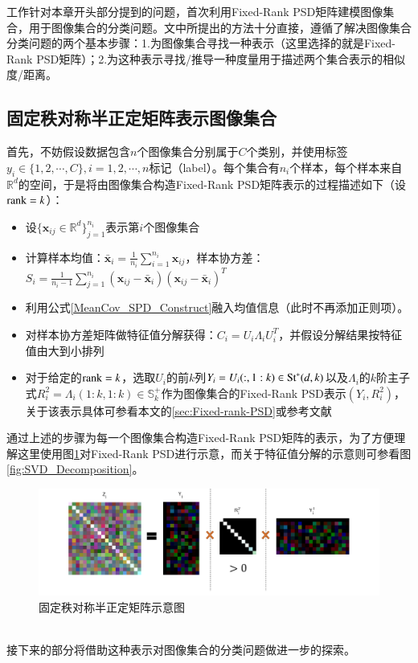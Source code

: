 工作\cite{PSD_WACV}针对本章开头部分提到的问题，首次利用Fixed-Rank PSD矩阵建模图像集合，用于图像集合的分类问题。文中所提出的方法十分直接，遵循了解决图像集合分类问题的两个基本步骤：1.为图像集合寻找一种表示（这里选择的就是Fixed-Rank PSD矩阵）；2.为这种表示寻找/推导一种度量用于描述两个集合表示的相似度/距离。
\subsection{固定秩对称半正定矩阵表示图像集合}
\label{sec:Fixed_Rank_PSD_repr_Imageset}
首先，不妨假设数据包含$n$个图像集合分别属于$C$个类别，并使用标签$y_{i}\in\{1,2,\cdots,C\},i=1,2,\cdots,n$标记（label）。每个集合有$n_i$个样本，每个样本来自$\mathbb{R}^{d}$的空间，于是将由图像集合构造Fixed-Rank PSD矩阵表示的过程描述如下（设${\rm rank}=k$）：
\begin{itemize}
\label{construct_fixed_rank_PSD}
\item 设$\{\bm{x}_{ij} \in \mathbb{R}^{d}\}_{j=1}^{n_i}$表示第$i$个图像集合
\item 计算样本均值：$\bar{\bm{x}}_i=\frac{1}{n_i}\sum_{i=1}^{n_i} \bm{x}_{ij}$，样本协方差：$S_i=\frac{1}{n_i-1}\sum_{j=1}^{n_i}(\bm{x}_{ij}-\bar{\bm{x}}_i)(\bm{x}_{ij}-\bar{\bm{x}}_i)^{T}$
\item 利用公式\ref{MeanCov_SPD_Construct}融入均值信息（此时不再添加正则项）。
\item 对样本协方差矩阵做特征值分解获得：$C_i=U_i\Lambda_iU_{i}^{T}$，并假设分解结果按特征值由大到小排列
\item 对于给定的${\rm rank}=k$，选取$U_i$的前$k$列$Y_i=U_i(:,1:k)\in {\rm St}^{*}(d,k)$以及$\Lambda_i$的$k$阶主子式$R_{i}^{2}=\Lambda_{i}(1:k,1:k)\in \mathbb{S}_{k}^{+}$作为图像集合的Fixed-Rank PSD表示$(Y_i,R_{i}^{2})$，关于该表示具体可参看本文的\ref{sec:Fixed-rank-PSD}或参考文献\cite{PSD_Riemannian}
\end{itemize}
通过上述的步骤为每一个图像集合构造Fixed-Rank PSD矩阵的表示，为了方便理解这里使用图\ref{fig:FRPSD}对Fixed-Rank PSD进行示意，而关于特征值分解的示意则可参看图\ref{fig:SVD_Decomposition}。
\begin{figure}[hbt]
	\centering
	\includegraphics[width=\linewidth]{source/FRPSD.png}
	\caption{固定秩对称半正定矩阵示意图}
	\label{fig:FRPSD}
\end{figure}\\
接下来的部分将借助这种表示对图像集合的分类问题做进一步的探索。

